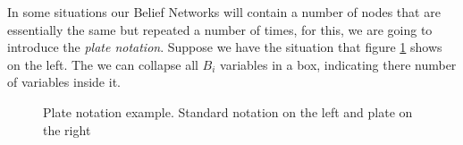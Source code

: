 In some situations our Belief Networks will contain a number of nodes that are
essentially the same but repeated a number of times, for this, we are going to
introduce the \emph{plate notation}. Suppose we have the situation that figure
\ref{fig:plate_notation} shows on the left. The we can collapse all \(B_i\)
variables in a box, indicating there number of variables inside it.

\begin{figure}[h]
\centering
{}
\caption{Plate notation example. Standard notation on the left and plate on the right}
\label{fig:plate_notation}
\end{figure}
